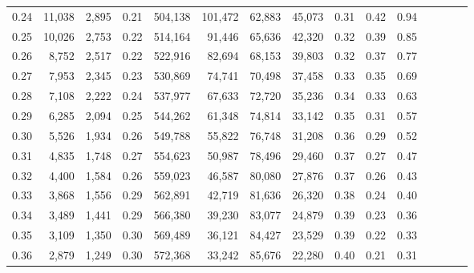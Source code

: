 \begin{tabular}{rrrcrrrrrrrrrrr}
0.24 &  11,038 &  2,895 &                                       0.21 &  504,138 &  101,472 &   62,883 &   45,073 &  0.31 &  0.42 &                         0.94 \\
0.25 &  10,026 &  2,753 &                                       0.22 &  514,164 &   91,446 &   65,636 &   42,320 &  0.32 &  0.39 &                         0.85 \\
0.26 &   8,752 &  2,517 &                                       0.22 &  522,916 &   82,694 &   68,153 &   39,803 &  0.32 &  0.37 &                         0.77 \\
0.27 &   7,953 &  2,345 &                                       0.23 &  530,869 &   74,741 &   70,498 &   37,458 &  0.33 &  0.35 &                         0.69 \\
0.28 &   7,108 &  2,222 &                                       0.24 &  537,977 &   67,633 &   72,720 &   35,236 &  0.34 &  0.33 &                         0.63 \\
0.29 &   6,285 &  2,094 &                                       0.25 &  544,262 &   61,348 &   74,814 &   33,142 &  0.35 &  0.31 &                         0.57 \\
0.30 &   5,526 &  1,934 &                                       0.26 &  549,788 &   55,822 &   76,748 &   31,208 &  0.36 &  0.29 &                         0.52 \\
0.31 &   4,835 &  1,748 &                                       0.27 &  554,623 &   50,987 &   78,496 &   29,460 &  0.37 &  0.27 &                         0.47 \\
0.32 &   4,400 &  1,584 &                                       0.26 &  559,023 &   46,587 &   80,080 &   27,876 &  0.37 &  0.26 &                         0.43 \\
0.33 &   3,868 &  1,556 &                                       0.29 &  562,891 &   42,719 &   81,636 &   26,320 &  0.38 &  0.24 &                         0.40 \\
0.34 &   3,489 &  1,441 &                                       0.29 &  566,380 &   39,230 &   83,077 &   24,879 &  0.39 &  0.23 &                         0.36 \\
0.35 &   3,109 &  1,350 &                                       0.30 &  569,489 &   36,121 &   84,427 &   23,529 &  0.39 &  0.22 &                         0.33 \\
0.36 &   2,879 &  1,249 &                                       0.30 &  572,368 &   33,242 &   85,676 &   22,280 &  0.40 &  0.21 &                         0.31 \\

\end{tabular}

